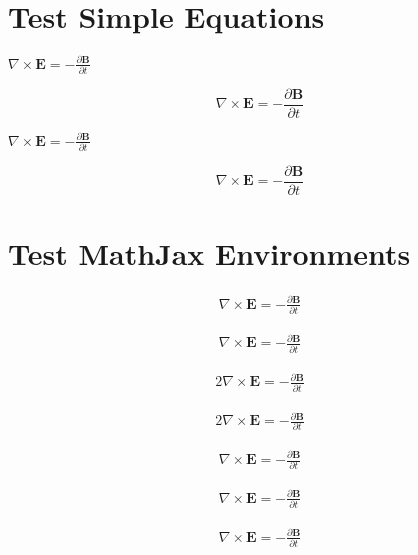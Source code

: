 



\chapter{Test Simple Equations}
\label{testsimpleequations}

$\nabla \times \mathbf{E} = - \frac{\partial \mathbf{B}}{\partial t}$

$$\nabla \times \mathbf{E} = - \frac{\partial \mathbf{B}}{\partial t}$$

$\nabla \times \mathbf{E} = - \frac{\partial \mathbf{B}}{\partial t}$

\[\nabla \times \mathbf{E} = - \frac{\partial \mathbf{B}}{\partial t}\]

\chapter{Test MathJax Environments}
\label{testmathjaxenvironments}

\begin{align}
\nabla \times \mathbf{E} = - \frac{\partial \mathbf{B}}{\partial t}
\end{align}

\begin{align*}
\nabla \times \mathbf{E} = - \frac{\partial \mathbf{B}}{\partial t}
\end{align*}

\begin{alignat}{2}
\nabla \times \mathbf{E} = - \frac{\partial \mathbf{B}}{\partial t}
\end{alignat}

\begin{alignat*}{2}
\nabla \times \mathbf{E} = - \frac{\partial \mathbf{B}}{\partial t}
\end{alignat*}

\[
\begin{aligned}
\nabla \times \mathbf{E} = - \frac{\partial \mathbf{B}}{\partial t}
\end{aligned}
\]

\[
\begin{alignedat}{2}
\nabla \times \mathbf{E} = - \frac{\partial \mathbf{B}}{\partial t}
\end{alignedat}
\]

\[
\begin{array}{lcl}
\nabla \times \mathbf{E} = - \frac{\partial \mathbf{B}}{\partial t}
\end{array}
\]

